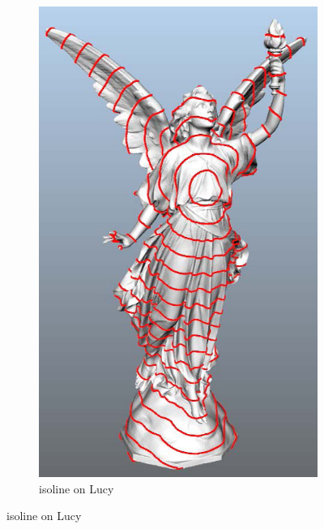 \begin{figure}
\begin{subfigure}[b]{0.5\textwidth}
                \includegraphics[width=\textwidth]{../images/geodesic_image/lucy_iso-1}
                \caption{isoline on Lucy}
                \label{fig:lucy_iso}
        \end{subfigure}%



\end{figure}

